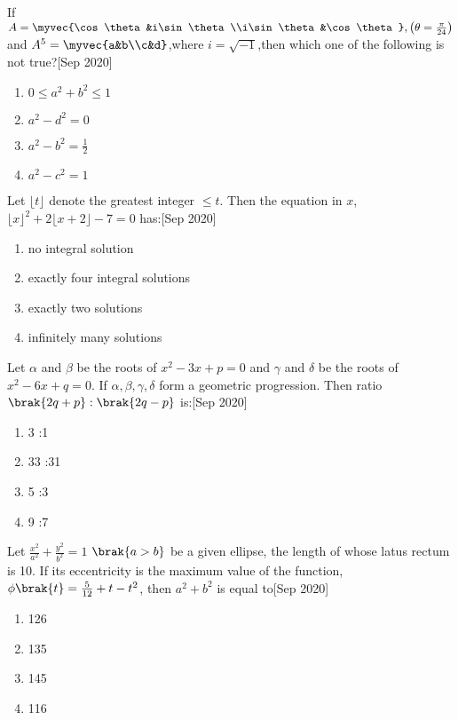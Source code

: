 \iffalse
    \title{2020}
    \author{ee24btech11009}
    \section{mcq-single}
\fi
\item If $A=\myvec{\cos\theta&i\sin\theta\\i\sin\theta&\cos\theta},\left(\theta=\frac{\pi}{24}\right)$ and $A^5=\myvec{a&b\\c&d}$,where $i=\sqrt{-1}$,then which one of the following is not true?\hfill{[Sep 2020]}
\begin{enumerate}
    \item $0\leq a^2+b^2\leq1$
    \item $a^2-d^2=0$
    \item $a^2-b^2=\frac{1}{2}$
    \item $a^2-c^2=1$
\end{enumerate}
\item Let $\lfloor t\rfloor$ denote the greatest integer $\leq t$. Then the equation in $x$,$\lfloor x\rfloor^2+2\lfloor x+2\rfloor-7=0$ has:\hfill{[Sep 2020]}
\begin{enumerate}
    \item no integral solution
    \item exactly four integral solutions
    \item exactly two solutions
    \item infinitely many solutions
    \end{enumerate}
\item Let $\alpha$ and $\beta$ be the roots of $x^2-3x+p=0$ and $\gamma$ and $\delta$ be the roots of $x^2-6x+q=0$. If $\alpha,\beta,\gamma,\delta$ form a geometric progression. Then ratio $\brak{2q+p}:\brak{2q-p}$ is:\hfill{[Sep 2020]}
\begin{enumerate}
    \item 3 :1
    \item 33 :31
    \item 5 :3
    \item 9 :7
\end{enumerate}
\item Let $\frac{x^2}{a^2}+\frac{y^2}{b^2}=1$ $\brak{a>b}$ be a given ellipse, the length of whose latus rectum is 10. If its eccentricity is the maximum value of the function, $\phi\brak{t}=\frac{5}{12}+t-t^2$, then $a^2 + b^2$ is equal to\hfill{[Sep 2020]}
\begin{enumerate}
    \item 126
    \item 135
    \item 145
    \item 116
\end{enumerate}
